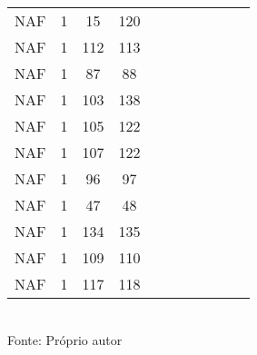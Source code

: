 \begin{table}[H]
{\begin{tabular}{ccccccccccc}
NAF & 1 & 15 & 120 &  &  &  &  &  &  &  \\
NAF & 1 & 112 & 113 &  &  &  &  &  &  &  \\
NAF & 1 & 87 & 88 &  &  &  &  &  &  &  \\
NAF & 1 & 103 & 138 &  &  &  &  &  &  &  \\
NAF & 1 & 105 & 122 &  &  &  &  &  &  &  \\
NAF & 1 & 107 & 122 &  &  &  &  &  &  &  \\
NAF & 1 & 96 & 97 &  &  &  &  &  &  &  \\
NAF & 1 & 47 & 48 &  &  &  &  &  &  &  \\
NAF & 1 & 134 & 135 &  &  &  &  &  &  &  \\
NAF & 1 & 109 & 110 &  &  &  &  &  &  &  \\
NAF & 1 & 117 & 118 &  &  &  &  &  &  &  \\
\bottomrule
\end{tabular}}
\\Fonte: Próprio autor
\end{table}


